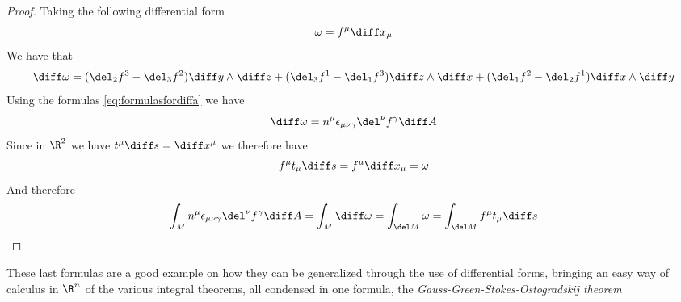 \documentclass[../mmf.tex]{subfiles}
\begin{document}
\begin{proof}
	Taking the following differential form
	\begin{equation*}
		\omega=f^\mu\diff x_\mu
	\end{equation*}
	We have that
	\begin{equation*}
		\diff\omega=(\del_2f^3-\del_3f^2)\diff y\wedge\diff z+(\del_3f^1-\del_1f^3)\diff z\wedge\diff x+(\del_1f^2-\del_2f^1)\diff x\wedge\diff y
	\end{equation*}
	Using the formulas \eqref{eq:formulasfordiffa} we have
	\begin{equation*}
		\diff\omega=n^\mu\epsilon_{\mu\nu\gamma}\del^\nu f^\gamma\diff A
	\end{equation*}
	Since in $\R^2$ we have $t^\mu\diff s=\diff x^\mu$ we therefore have
	\begin{equation*}
		f^\mu t_\mu\diff s=f^\mu\diff x_\mu=\omega
	\end{equation*}
	And therefore
	\begin{equation*}
		\int_Mn^\mu\epsilon_{\mu\nu\gamma}\del^\nu f^\gamma\diff A=\int_M\diff\omega=\int_{\del M}\omega=\int_{\del M}f^\mu t_\mu\diff s
	\end{equation*}
\end{proof}
These last formulas are a good example on how they can be generalized through the use of differential forms, bringing an easy way of calculus in $\R^n$ of the various integral theorems, all condensed in one formula, the \textit{Gauss-Green-Stokes-Ostogradskij theorem}
\end{document}

